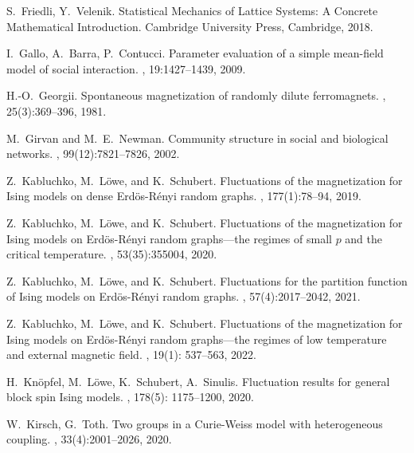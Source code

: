 \documentclass[11pt,oneside]{amsart}
\numberwithin{equation}{section}  %
\theoremstyle{plain}
\theoremstyle{remark}
\begin{document}
\begin{thebibliography}{}
S.~Friedli, Y.~Velenik.
\newblock Statistical Mechanics of Lattice Systems: A Concrete Mathematical Introduction. Cambridge University Press, Cambridge, 2018.

I.~Gallo, A.~Barra, P.~Contucci. 
\newblock  Parameter evaluation of a simple mean-field model of social interaction. 
, 19:1427--1439, 2009.

H.-O.~Georgii.
\newblock Spontaneous magnetization of randomly dilute ferromagnets.
, 25(3):369--396, 1981.

M.~Girvan and M.~E.~Newman. 
\newblock Community structure in social and biological networks. 
, 99(12):7821--7826, 2002.

Z.~Kabluchko, M.~L\"owe, and K.~Schubert.
\newblock Fluctuations of the magnetization for Ising models on dense
  Erd\"os-R\'enyi random graphs.
, 177(1):78--94, 2019.

Z.~Kabluchko, M.~L\"owe, and K.~Schubert.
\newblock Fluctuations of the magnetization for Ising models on
Erd\"os-{R}\'enyi random graphs---the regimes of small $p$ and the critical temperature.
, 53(35):355004, 2020.

Z.~Kabluchko, M.~L\"owe, and K.~Schubert.
\newblock
Fluctuations for the partition function of Ising models on
Erd\"os-{R}\'enyi random graphs.
,
57(4):2017--2042, 2021.

Z.~Kabluchko, M.~L\"owe, and K.~Schubert.
\newblock
Fluctuations of the magnetization for {I}sing models on
Erd\"os-{R}\'enyi  random graphs---the regimes of low temperature and external magnetic field.
, 19(1): 537--563, 2022.

H.~Kn\"opfel, M.~L\"owe, K.~Schubert, A.~Sinulis.
\newblock Fluctuation results for general block spin {I}sing models.
, 178(5): 1175--1200, 2020.

W.~Kirsch, G.~Toth.
\newblock  Two groups in a Curie-Weiss model with heterogeneous coupling. 
, 33(4):2001--2026, 2020.


\end{thebibliography}
\end{document}
